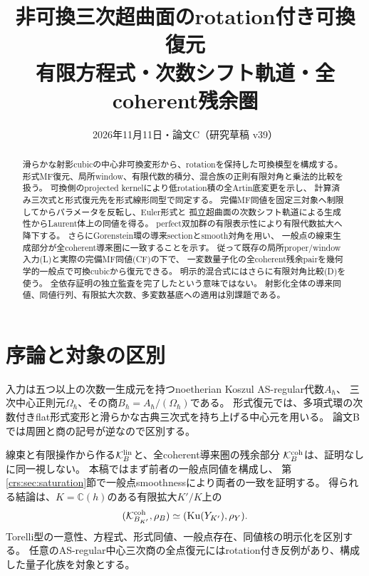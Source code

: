 
\title{非可換三次超曲面のrotation付き可換復元\\
\large 有限方程式・次数シフト軌道・全coherent残余圏}
\author{}
\date{2026年11月11日・論文C（研究草稿 v39）}

\maketitle
\begin{abstract}
滑らかな射影cubicの中心非可換変形から、rotationを保持した可換模型を構成する。
形式MF復元、局所window、有限代数的積分、混合族の正則有限対角と乗法的比較を扱う。
可換側のprojected kernelにより低rotation積の全Artin底変更を示し、
計算済み三次式と形式復元先を形式線形同型で同定する。
完備MF同値を固定三対象へ制限してからパラメータを反転し、Euler形式と
孤立超曲面の次数シフト軌道による生成性からLaurent体上の同値を得る。
perfect双加群の有限表示性により有限代数拡大へ降下する。
さらにGorenstein環の導来sectionとsmooth対角を用い、
一般点の線束生成部分が全coherent導来圏に一致することを示す。
従って既存の局所proper/window入力(L)と実際の完備MF同値(CF)の下で、
一変数量子化の全coherent残余pairを幾何学的一般点で可換cubicから復元できる。
明示的混合式にはさらに有限対角比較(D)を使う。
全依存証明の独立監査を完了したという意味ではない。
射影化全体の導来同値、同値行列、有限拡大次数、多変数基底への適用は別課題である。
\end{abstract}
\tableofcontents
\section{序論と対象の区別}\label{sec:paperC-introduction}
入力は五つ以上の次数一生成元を持つnoetherian Koszul AS-regular代数$A_\hbar$、
三次中心正則元$\Omega_\hbar$、その商$B_\hbar=A_\hbar/(\Omega_\hbar)$である。
形式復元では、多項式環の次数付きflat形式変形と滑らかな古典三次式を持ち上げる中心元を用いる。
論文Bでは周囲と商の記号が逆なので区別する。

線束と有限操作から作る$\mathcal K_B^{\rm lin}$と、全coherent導来圏の残余部分
$\mathcal K_B^{\rm coh}$は、証明なしに同一視しない。
本稿ではまず前者の一般点同値を構成し、
第\ref{crs:sec:saturation}節で一般点smoothnessにより両者の一致を証明する。
得られる結論は、$K=\mathbb C(h)$のある有限拡大$K'/K$上の
\[
 (\mathcal K^{\rm coh}_{B_{K'}},\rho_B)
 \simeq(\operatorname{Ku}(Y_{K'}),\rho_Y).
\]
Torelli型の一意性、方程式、形式同値、一般点存在、同値核の明示化を区別する。
任意のAS-regular中心三次商の全点復元にはrotation付き反例があり、構成した量子化族を対象とする。

